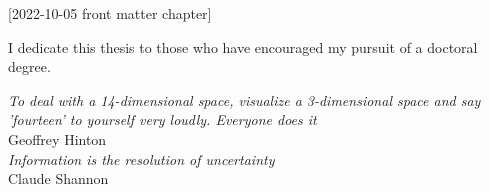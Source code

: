 [2022-10-05 front matter chapter]
%
%
%
%
%
%

%
%
%
\begin{statement}
\end{statement}

\begin{dedication}
I dedicate this thesis to those who have encouraged my pursuit of a doctoral degree.  


\vspace{1in}
\textit{To deal with a 14-dimensional space, visualize a 3-dimensional space and say 'fourteen' to yourself very loudly. Everyone does it}\\ Geoffrey Hinton \\
\vspace{1in}
\textit{Information is the resolution of uncertainty} \\Claude Shannon
\vspace{1in}



\end{dedication}

\begin{acknowledgments}

\end{acknowledgments}

